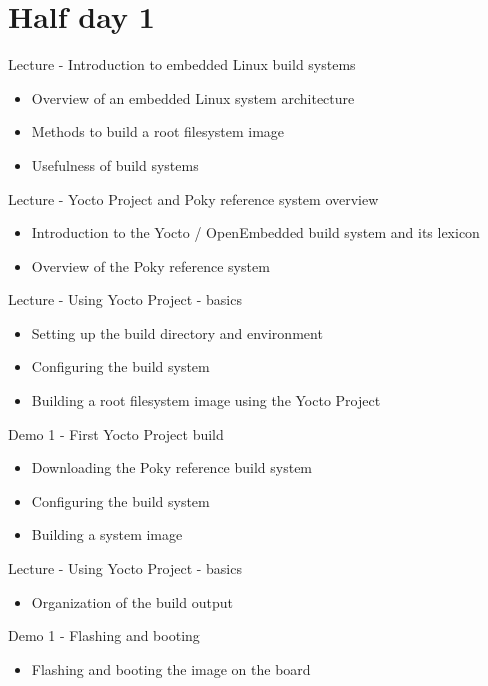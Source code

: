 \documentclass[a4paper,12pt,obeyspaces,spaces,hyphens]{article}
\begin{document}
\section{Half day 1}

\feagendaonecolumn
{Lecture - Introduction to embedded Linux build systems}
{
  \begin{itemize}
  \item Overview of an embedded Linux system architecture
  \item Methods to build a root filesystem image
  \item Usefulness of build systems
  \end{itemize}
}

\feagendaonecolumn
{Lecture - Yocto Project and Poky reference system overview}
{
  \begin{itemize}
  \item Introduction to the Yocto / OpenEmbedded build system and its lexicon
  \item Overview of the Poky reference system
  \end{itemize}
}

\feagendatwocolumn
{Lecture - Using Yocto Project - basics}
{
  \begin{itemize}
  \item Setting up the build directory and environment
  \item Configuring the build system
  \item Building a root filesystem image using the Yocto Project
  \end{itemize}
}
{Demo 1 - First Yocto Project build}
{
  \begin{itemize}
  \item Downloading the Poky reference build system
  \item Configuring the build system
  \item Building a system image
 \end{itemize}
}

\feagendatwocolumn
{Lecture - Using Yocto Project - basics}
{
  \begin{itemize}
  \item Organization of the build output
  \end{itemize}
}
{Demo 1 - Flashing and booting}
{
  \begin{itemize}
  \item Flashing and booting the image on the board
  \end{itemize}
}

\newpage
\end{document}
